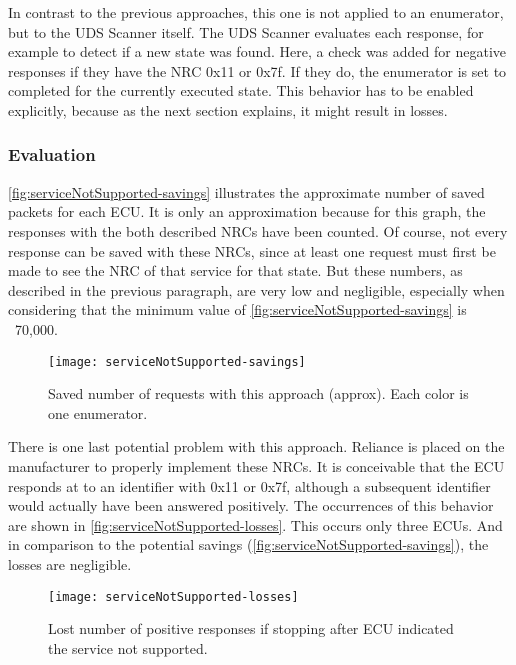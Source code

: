 In contrast to the previous approaches, this one is not applied to an enumerator, but to the UDS Scanner itself. The UDS Scanner evaluates each response, for example to detect if a new state was found. Here, a check was added for negative responses if they have the NRC 0x11 or 0x7f. If they do, the enumerator is set to completed for the currently executed state. This behavior has to be enabled explicitly, because as the next section explains, it might result in losses.

\subsubsection{Evaluation}

\autoref{fig:serviceNotSupported-savings} illustrates the approximate number of saved packets for each ECU. It is only an approximation because for this graph, the responses with the both described NRCs have been counted. Of course, not every response can be saved with these NRCs, since at least one request must first be made to see the NRC of that service for that state. But these numbers, as described in the previous paragraph, are very low and negligible, especially when considering that the minimum value of \autoref{fig:serviceNotSupported-savings} is ~70,000.

\begin{figure}[h]
    \centering
    \texttt{[image: serviceNotSupported-savings]}
    \caption{Saved number of requests with this approach (approx). Each color is one enumerator.}
    \label{fig:serviceNotSupported-savings}
\end{figure}

There is one last potential problem with this approach. Reliance is placed on the manufacturer to properly implement these NRCs. It is conceivable that the ECU responds at to an identifier with 0x11 or 0x7f, although a subsequent identifier would actually have been answered positively. The occurrences of this behavior are shown in \autoref{fig:serviceNotSupported-losses}. This occurs only three ECUs.
And in comparison to the potential savings (\autoref{fig:serviceNotSupported-savings}), the losses are negligible.

\begin{figure}[h]
    \centering
    \texttt{[image: serviceNotSupported-losses]}
    \caption{Lost number of positive responses if stopping after ECU indicated the service not supported.}
    \label{fig:serviceNotSupported-losses}
\end{figure}
